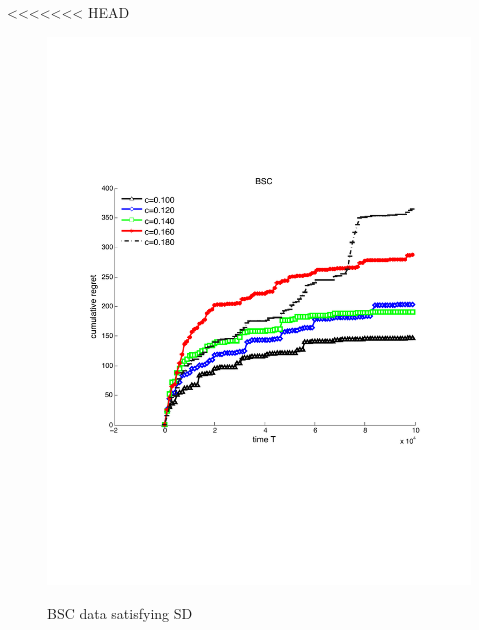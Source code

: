 
<<<<<<< HEAD
\begin{figure}[!bt]
	\begin{minipage}{4cm}
		\centering
		\includegraphics[scale=0.21]{../Simulations/Figures/BSC_SD}
		\label{fig:BSC_SD}
		\vspace{-.2cm}
		\caption{BSC data satisfying SD}
	\end{minipage}
	\begin{minipage}{4cm}
		\centering

\end{minipage}
\end{figure}
